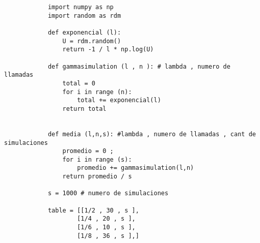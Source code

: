 \documentclass{article}
\begin{document}
\begin{flushleft}
        \begin{verbatim}
            import numpy as np 
            import random as rdm

            def exponencial (l):
                U = rdm.random()   
                return -1 / l * np.log(U) 

            def gammasimulation (l , n ): # lambda , numero de llamadas
                total = 0 
                for i in range (n):
                    total += exponencial(l)
                return total     


            def media (l,n,s): #lambda , numero de llamadas , cant de simulaciones
                promedio = 0 ;
                for i in range (s):
                    promedio += gammasimulation(l,n)
                return promedio / s     

            s = 1000 # numero de simulaciones 

            table = [[1/2 , 30 , s ],
                    [1/4 , 20 , s ],
                    [1/6 , 10 , s ],
                    [1/8 , 36 , s ],]

        \end{verbatim}
    \end{flushleft}
   
   
\end{document}
